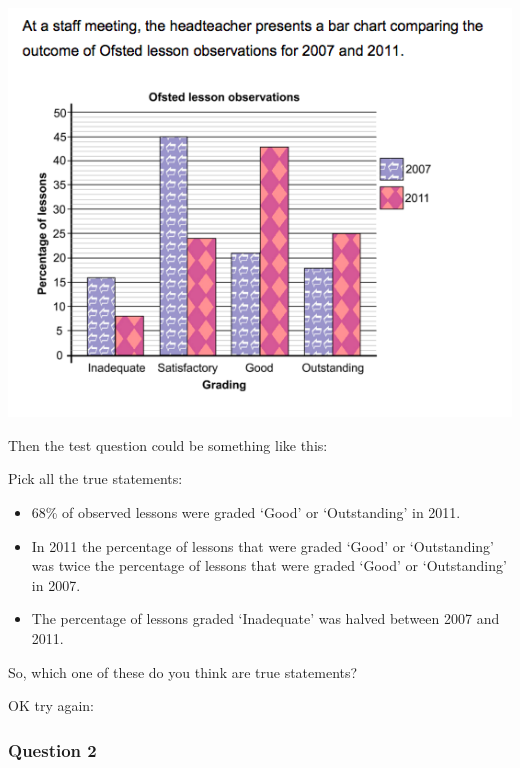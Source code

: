 \documentclass[
]{book}
\providecommand{\tightlist}{%
  \setlength{\itemsep}{0pt}\setlength{\parskip}{0pt}}
\begin{document}
\includegraphics{imgs/numtest_1.png}

Then the test question could be something like this:

Pick all the true statements:

\begin{itemize}
\tightlist
\item
  68\% of observed lessons were graded `Good' or `Outstanding' in 2011.
\item
  In 2011 the percentage of lessons that were graded `Good' or `Outstanding' was twice the percentage of lessons that were graded `Good' or `Outstanding' in 2007.
\item
  The percentage of lessons graded `Inadequate' was halved between 2007 and 2011.
\end{itemize}

So, which one of these do you think are true statements?

OK try again:

\hypertarget{question-2}{%
\subsubsection*{Question 2}\label{question-2}}
\end{document}
